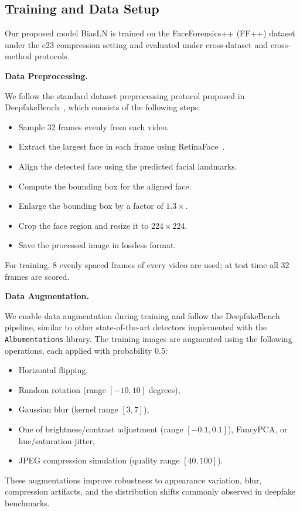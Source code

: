 \documentclass[fonts]{icst}
\newif\ifrevmark\revmarktrue
\newcommand{\rev}[1]{\ifrevmark{\color{revblue}#1}\else#1\fi}
\begin{document}
\subsection{Training and Data Setup}
\label{sec:impl}

Our proposed model BiasLN is trained on the FaceForensics++ (FF++) dataset under the c23 compression setting and evaluated under cross-dataset and cross-method protocols.

\noindent\textbf{Data Preprocessing.}\par
We follow the standard dataset preprocessing protocol proposed in DeepfakeBench~\cite{yan2023deepfakebench}, which consists of the following steps:
\begin{itemize}[leftmargin=*, topsep=2pt, itemsep=2pt, label=--]
    \item Sample 32 frames evenly from each video.
    \item Extract the largest face in each frame using RetinaFace~\cite{deng2020retinaface}.
    \item Align the detected face using the predicted facial landmarks.
    \item Compute the bounding box for the aligned face.
    \item Enlarge the bounding box by a factor of $1.3\times$.
    \item Crop the face region and resize it to $224 \times 224$.
    \item Save the processed image in lossless format.
\end{itemize}
\rev{For training, 8 evenly spaced frames of every video are used; at test time all 32 frames are scored.}

\noindent\textbf{Data Augmentation.}\par
We enable data augmentation during training and follow the DeepfakeBench~\cite{yan2023deepfakebench} pipeline, similar to other state-of-the-art detectors implemented with the \texttt{Albumentations} library.
The training images are augmented using \rev{the following operations, each applied with probability 0.5}:
\begin{itemize}[leftmargin=*, topsep=2pt, itemsep=2pt, label=--]
    \item Horizontal flipping,
    \item Random rotation (range $[-10, 10]$ degrees),
    \item Gaussian blur (kernel range $[3, 7]$),
    \item \rev{One of} brightness/contrast adjustment (range $[-0.1, 0.1]$)\rev{, FancyPCA, or hue/saturation jitter},
    \item JPEG compression simulation (quality range $[40, 100]$).
\end{itemize}
These augmentations improve robustness to appearance variation, blur, compression artifacts, and the distribution shifts commonly observed in deepfake benchmarks.
\end{document}
